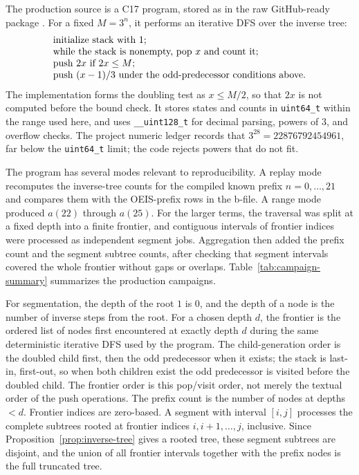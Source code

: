 \documentclass[11pt]{article}
\theoremstyle{definition}
\theoremstyle{remark}
\begin{document}
The production source is a C17 program, stored as  in the
raw GitHub-ready package \cite{cortiA224540Package2026}.  For a fixed
\(M=3^n\), it performs an iterative DFS over the inverse tree:
\[
\begin{array}{l}
\hbox{initialize stack with }1;\\
\hbox{while the stack is nonempty, pop }x\hbox{ and count it;}\\
\hbox{push }2x\hbox{ if }2x\leq M;\\
\hbox{push }(x-1)/3\hbox{ under the odd-predecessor conditions above.}
\end{array}
\]
The implementation forms the doubling test as \(x\leq M/2\), so that \(2x\)
is not computed before the bound check.  It stores states and counts in
\texttt{uint64\_t} within the range used here, and uses \texttt{\_\_uint128\_t}
for decimal parsing, powers of \(3\), and overflow checks.  The project
numeric ledger records that \(3^{28}=22876792454961\), far below the
\texttt{uint64\_t} limit; the code rejects powers that do not fit.

The program has several modes relevant to reproducibility.  A replay mode
recomputes the inverse-tree counts for the compiled known prefix
\(n=0,\ldots,21\) and compares them with the OEIS-prefix rows in the b-file.
A range mode produced \(a(22)\) through \(a(25)\).  For the larger terms, the
traversal was split at a fixed depth into a finite frontier, and contiguous
intervals of frontier indices were processed as independent segment jobs.
Aggregation then added the prefix count and the segment subtree counts, after
checking that segment intervals covered the whole frontier without gaps or
overlaps.  Table~\ref{tab:campaign-summary} summarizes the production
campaigns.

For segmentation, the depth of the root \(1\) is \(0\), and the depth of a
node is the number of inverse steps from the root.  For a chosen depth \(d\),
the frontier is the ordered list of nodes first encountered at exactly depth
\(d\) during the same deterministic iterative DFS used by the program.  The
child-generation order is the doubled child first, then the odd predecessor
when it exists; the stack is last-in, first-out, so when both children exist
the odd predecessor is visited before the doubled child.  The frontier order
is this pop/visit order, not merely the textual order of the push operations.
The prefix count is the number of nodes at depths \(<d\).  Frontier indices are
zero-based.  A segment with interval \([i,j]\) processes the complete subtrees
rooted at frontier indices \(i,i+1,\ldots,j\), inclusive.  Since
Proposition~\ref{prop:inverse-tree} gives a rooted tree, these segment subtrees
are disjoint, and the union of all frontier intervals together with the prefix
nodes is the full truncated tree.
\end{document}

